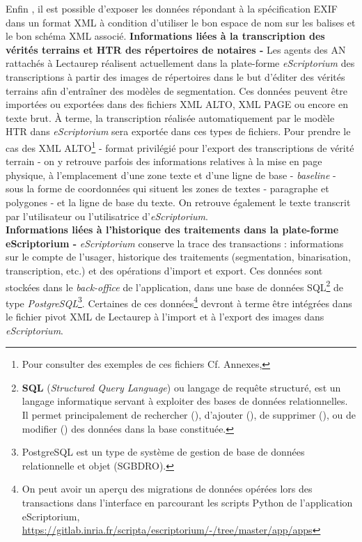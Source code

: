 Enfin , il est possible d'exposer les données répondant à la spécification EXIF dans un format XML à condition d'utiliser le bon espace de nom sur les balises et le bon schéma XML associé.
\newpage
\textbf{Informations liées à la transcription des vérités terrains et HTR des répertoires de notaires -} 
Les agents des AN rattachés à Lectaurep réalisent actuellement dans la plate-forme \textit{eScriptorium} des transcriptions à partir des images de répertoires dans le but d'éditer des vérités terrains afin d'entraîner des modèles de segmentation. Ces données peuvent être importées ou exportées dans des fichiers XML ALTO, XML PAGE ou encore en texte brut. À terme, la transcription réalisée automatiquement par le modèle HTR dans \textit{eScriptorium} sera exportée dans ces types de fichiers. Pour prendre le cas des XML ALTO\footnote{Pour consulter des exemples de ces fichiers Cf. Annexes, } - format privilégié pour l'export des transcriptions de vérité terrain - on y retrouve parfois des informations relatives à la mise en page physique, à l'emplacement d'une zone texte et d'une ligne de base - \textit{baseline} - sous la forme de coordonnées qui situent les zones de textes - paragraphe et polygones - et la ligne de base du texte. On retrouve également le texte transcrit par l'utilisateur ou l'utilisatrice d'\textit{eScriptorium}.\\

\textbf{Informations liées à l'historique des traitements dans la plate-forme eScriptorium -} \textit{eScriptorium} conserve la trace des transactions  : informations sur le compte de l'usager, historique des traitements (segmentation, binarisation, transcription, etc.) et des opérations d'import et export. Ces données sont stockées dans le \textit{back-office} de l'application, dans une base de données SQL\footnote{\textbf{SQL} (\textit{Structured Query Language}) ou langage de requête structuré, est un langage informatique servant à exploiter des bases de données relationnelles. Il permet principalement de rechercher (), d'ajouter (), de supprimer (), ou de modifier () des données dans la base constituée.} de type \textit{PostgreSQL}\footnote{PostgreSQL est un type de système de gestion de base de données relationnelle et objet (SGBDRO).}. Certaines de ces données\footnote{On peut avoir un aperçu des migrations de données opérées lors des transactions dans l'interface en parcourant les scripts Python de l'application eScriptorium, \url{https://gitlab.inria.fr/scripta/escriptorium/-/tree/master/app/apps}} devront à terme  être intégrées dans le fichier pivot XML de Lectaurep à l'import et à l'export des images dans \textit{eScriptorium}.\\

